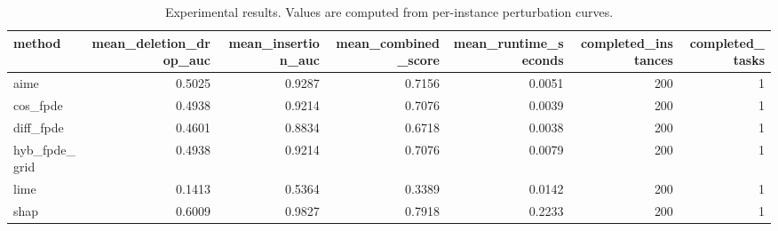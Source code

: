\begin{table}[t]
\caption{Experimental results. Values are computed from per-instance perturbation curves.}
\label{tab:main_results_computed}
\centering
\begin{tabular}{lrrrrrr}
\toprule
method & mean\_deletion\_drop\_auc & mean\_insertion\_auc & mean\_combined\_score & mean\_runtime\_seconds & completed\_instances & completed\_tasks \\
\midrule
aime & 0.5025 & 0.9287 & 0.7156 & 0.0051 & 200 & 1 \\
cos\_fpde & 0.4938 & 0.9214 & 0.7076 & 0.0039 & 200 & 1 \\
diff\_fpde & 0.4601 & 0.8834 & 0.6718 & 0.0038 & 200 & 1 \\
hyb\_fpde\_grid & 0.4938 & 0.9214 & 0.7076 & 0.0079 & 200 & 1 \\
lime & 0.1413 & 0.5364 & 0.3389 & 0.0142 & 200 & 1 \\
shap & 0.6009 & 0.9827 & 0.7918 & 0.2233 & 200 & 1 \\
\bottomrule
\end{tabular}

\end{table}
